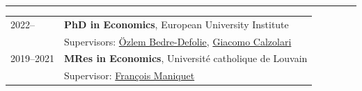 

\renewcommand{\thefootnote}{\fnsymbol{footnote}}
\setcounter{footnote}{0}

\hrule %

\begin{longtable}[l]{@{}p{} p{}}
    2022-- & \textbf{PhD in Economics}, European University Institute \\
    & Supervisors: \href{https://www.eui.eu/people?id=ozlem-bedre-defolie}{Özlem Bedre-Defolie}, \href{https://sites.google.com/view/giacomo-calzolari}{Giacomo Calzolari} \vspace{2mm} \\

    
    2019--2021 & \textbf{MRes in Economics},  Université catholique de Louvain \\
    & Supervisor: \href{https://sites.uclouvain.be/poresp/cv/cv_maniquet.pdf}{François Maniquet}  

    
\end{longtable}



\renewcommand{\thefootnote}{\arabic{footnote}}
\setcounter{footnote}{1}
